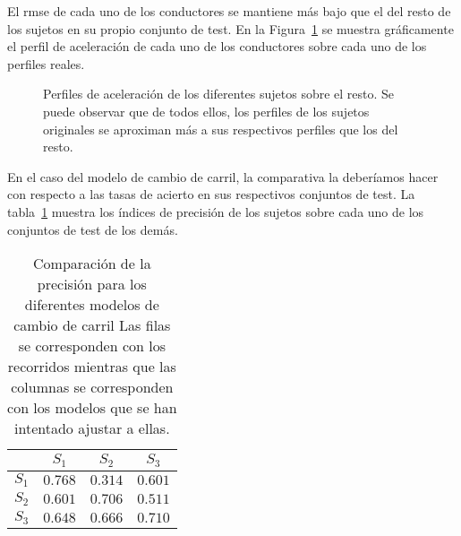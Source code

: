 El \ac{rmse} de cada uno de los conductores se mantiene más bajo que el del resto de los sujetos en su propio conjunto de test. En la Figura~\ref{fig:lm-subjects-comparison} se muestra gráficamente el perfil de aceleración de cada uno de los conductores sobre cada uno de los perfiles reales.

\begin{figure}[t]
	\centering
	\qquad
	\qquad
	\caption[Perfiles de aceleración de los diferentes sujetos sobre el resto]{Perfiles de aceleración de los diferentes sujetos sobre el resto. Se puede observar que de todos ellos, los perfiles de los sujetos originales se aproximan más a sus respectivos perfiles que los del resto.}
	\label{fig:lm-subjects-comparison}
\end{figure}

En el caso del modelo de cambio de carril, la comparativa la deberíamos hacer con respecto a las tasas de acierto en sus respectivos conjuntos de test. La tabla~\ref{tbl:lc-subjects-comparison} muestra los índices de precisión de los sujetos sobre cada uno de los conjuntos de test de los demás.

\begin{table}
	\centering
	\caption[Comparación de la precisión para los diferentes modelos de cambio de carril]{Comparación de la precisión para los diferentes modelos de cambio de carril Las filas se corresponden con los recorridos mientras que las columnas se corresponden con los modelos que se han intentado ajustar a ellas.}
	\label{tbl:lc-subjects-comparison}
	\begin{tabular}{cccc}
		\toprule
		& $S_1$ & $S_2$ & $S_3$ \\
		\midrule
		\rowcolor{black!20} $S_1$ & $0.768$ & $0.314$ & $0.601$ \\
		$S_2$ & $0.601$ & $0.706$ & $0.511$ \\
		\rowcolor{black!20} $S_3$ & $0.648$ & $0.666$ & $0.710$ \\
		\bottomrule
	\end{tabular}
\end{table}